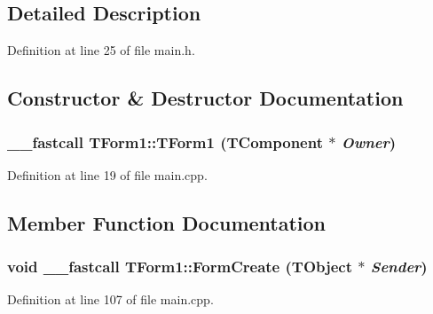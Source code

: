 \subsection{Detailed Description}


Definition at line 25 of file main.h.

\subsection{Constructor \& Destructor Documentation}
\hypertarget{classTForm1_4b77eaf706e8386bc8d79ec547efc8b9}{
\subsubsection[TForm1]{\setlength{\rightskip}{0pt plus 5cm}\_\-\_\-fastcall TForm1::TForm1 (TComponent $\ast$ {\em Owner})}}
\label{classTForm1_4b77eaf706e8386bc8d79ec547efc8b9}




Definition at line 19 of file main.cpp.

\subsection{Member Function Documentation}
\hypertarget{classTForm1_b28b545fbae8b12c714f4ba8d664e831}{
\subsubsection[FormCreate]{\setlength{\rightskip}{0pt plus 5cm}void \_\-\_\-fastcall TForm1::FormCreate (TObject $\ast$ {\em Sender})}}
\label{classTForm1_b28b545fbae8b12c714f4ba8d664e831}




Definition at line 107 of file main.cpp.

